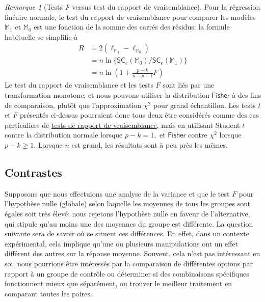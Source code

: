 \documentclass[
  11pt,
  letterpaper,
]{scrbook}
\theoremstyle{plain}
\theoremstyle{plain}
\theoremstyle{definition}
\theoremstyle{definition}
\theoremstyle{remark}
\newtheorem{refremark}{Remarque}[chapter]
\begin{document}
\begin{refremark}[Tests \emph{F} versus test du rapport de
vraisemblance]
Pour la régression linéaire normale, le test du rapport de vraisemblance
pour comparer les modèles \(\mathbb{M}_1\) et \(\mathbb{M}_0\) est une
fonction de la somme des carrés des résidus: la formule habituelle se
simplifie à \begin{align*}
R &= 2( \ell_{\mathbb{M}_1} - \ell_{\mathbb{M}_0}) \\&= n\ln\{\mathsf{SC}_e(\mathbb{M}_0)/\mathsf{SC}_e(\mathbb{M}_1)\}\\
&= n \ln \left( 1+ \frac{p-k}{n-p-1}F\right)
\end{align*} Le test du rapport de vraisemblance et les tests \(F\) sont
liés par une transformation monotone, et nous pouvons utiliser la
distribution \(\mathsf{Fisher}\) à des fins de comparaison, plutôt que
l'approximation \(\chi^2\) pour grand échantillon. Les tests \(t\) et
\(F\) présentés ci-dessus pourraient donc tous deux être considérés
comme des cas particuliers de \href{@sec-testsvrais}{tests de rapport de
vraisemblance}, mais en utilisant Student-\(t\) contre la distribution
normale lorsque \(p-k=1,\) et \(\mathsf{Fisher}\) contre \(\chi^2\)
lorsque \(p-k \ge 1.\) Lorsque \(n\) est grand, les résultats sont à peu
près les mêmes.

\label{rem-lrtvsF}

\end{refremark}

\subsection{Contrastes}\label{contrastes}

Supposons que nous effectuions une analyse de la variance et que le test
\(F\) pour l'hypothèse nulle (globale) selon laquelle les moyennes de
tous les groupes sont égales soit très élevé: nous rejetons l'hypothèse
nulle en faveur de l'alternative, qui stipule qu'au moins une des
moyennes du groupe est différente. La question suivante sera de savoir
où se situent ces différences. En effet, dans un contexte expérimental,
cela implique qu'une ou plusieurs manipulations ont un effet différent
des autres sur la réponse moyenne. Souvent, cela n'est pas intéressant
en soi: nous pourrions être intéressés par la comparaison de différentes
options par rapport à un groupe de contrôle ou déterminer si des
combinaisons spécifiques fonctionnent mieux que séparément, ou trouver
le meilleur traitement en comparant toutes les paires.
\end{document}

